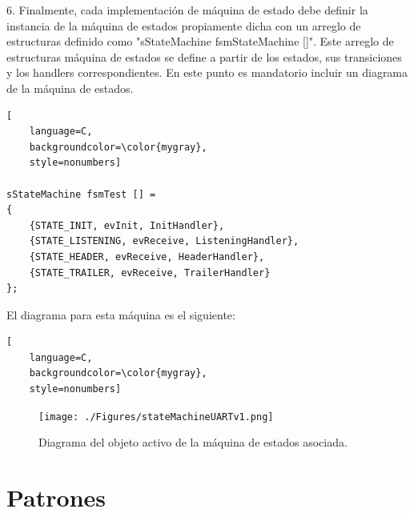 6. Finalmente, cada implementación de máquina de estado debe definir la instancia de la máquina de estados propiamente dicha con un arreglo de estructuras definido como "sStateMachine fsmStateMachine []". Este arreglo de estructuras máquina de estados se define a partir de los estados, sus transiciones y los handlers correspondientes. En este punto es mandatorio incluir un diagrama de la máquina de estados.

\begin{lstlisting}[
	language=C, 
	backgroundcolor=\color{mygray},
	style=nonumbers]

sStateMachine fsmTest [] = 
{
	{STATE_INIT, evInit, InitHandler},
	{STATE_LISTENING, evReceive, ListeningHandler},
	{STATE_HEADER, evReceive, HeaderHandler},
	{STATE_TRAILER, evReceive, TrailerHandler}
};
\end{lstlisting}


El diagrama para esta máquina es el siguiente:

\begin{lstlisting}[
	language=C, 
	backgroundcolor=\color{mygray},
	style=nonumbers]
\end{lstlisting}


\begin{figure}[ht]
	\centering
	\texttt{[image: ./Figures/stateMachineUARTv1.png]}
	\caption{Diagrama del objeto activo de la máquina de estados asociada.}
	\label{fig:fsmUARTv1}
\end{figure}

	
\pagebreak
\section{Patrones}




